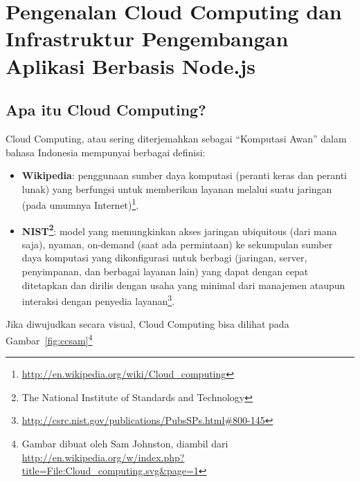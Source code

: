 \chapter{Pengenalan Cloud Computing dan Infrastruktur Pengembangan Aplikasi Berbasis Node.js}

\section{Apa itu Cloud Computing?}

Cloud Computing,  atau sering diterjemahkan sebagai ``Komputasi Awan'' dalam bahasa Indonesia mempunyai berbagai definisi:
\begin{itemize}
  \item \textbf{Wikipedia}: penggunaan sumber daya komputasi (peranti keras dan peranti lunak) yang berfungsi untuk memberikan layanan melalui suatu jaringan (pada umumnya Internet)\footnote{\url{http://en.wikipedia.org/wiki/Cloud_computing}}.
  \item \textbf{NIST\footnote{The National Institute of Standards and Technology}}: model yang memungkinkan akses jaringan ubiquitous (dari mana saja), nyaman, on-demand (saat ada permintaan) ke sekumpulan sumber daya komputasi yang dikonfigurasi untuk berbagi (jaringan, server, penyimpanan, dan berbagai layanan lain) yang dapat dengan cepat ditetapkan dan dirilis dengan usaha yang minimal dari manajemen ataupun interaksi dengan penyedia layanan\footnote{\url{http://csrc.nist.gov/publications/PubsSPs.html\#800-145}}.
\end{itemize}

Jika diwujudkan secara visual, Cloud Computing bisa dilihat pada Gambar~\ref{fig:ccsam}\footnote{Gambar dibuat oleh Sam Johnston, diambil dari \url{http://en.wikipedia.org/w/index.php?title=File:Cloud_computing.svg&page=1}}

